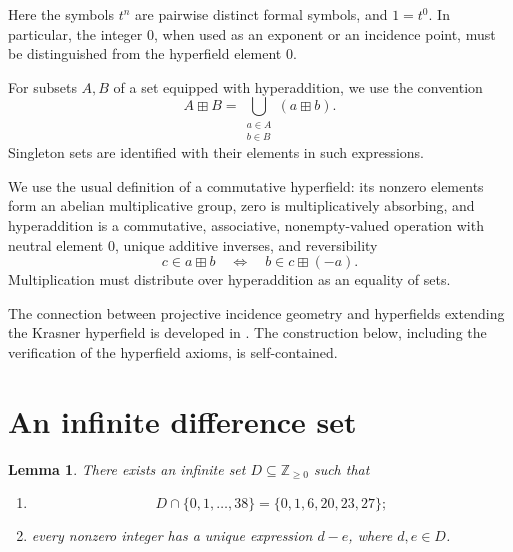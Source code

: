 \documentclass[11pt]{article}
\newcommand{\ZZ}{\mathbb{Z}}
\newtheorem{lemma}[theorem]{Lemma}
\begin{document}
Here the symbols \(t^n\) are pairwise distinct formal symbols, and \(1=t^0\).
In particular, the integer \(0\), when used as an exponent or an incidence
point, must be distinguished from the hyperfield element \(0\).

For subsets \(A,B\) of a set equipped with hyperaddition, we use the convention
\[
    A\boxplus B
    =\bigcup_{\substack{a\in A\\ b\in B}}(a\boxplus b).
\]
Singleton sets are identified with their elements in such expressions.

We use the usual definition of a commutative hyperfield: its nonzero elements
form an abelian multiplicative group, zero is multiplicatively absorbing,
and hyperaddition is a commutative, associative, nonempty-valued operation
with neutral element \(0\), unique additive inverses, and reversibility
\[
    c\in a\boxplus b
    \quad\Longleftrightarrow\quad
    b\in c\boxplus(-a).
\]
Multiplication must distribute over hyperaddition as an equality of sets.


The connection between projective incidence geometry and hyperfields
extending the Krasner hyperfield is developed in
\cite[Sections~3--4]{CC}. The construction below, including the verification
of the hyperfield axioms, is self-contained.

\section{An infinite difference set}

\begin{lemma}\label{lem:difference-set}
There exists an infinite set \(D\subseteq\ZZ_{\geq 0}\) such that
\begin{enumerate}
    \item
    \[
        D\cap\{0,1,\ldots,38\}=\{0,1,6,20,23,27\};
    \]
    \item every nonzero integer has a unique expression \(d-e\), where
    \(d,e\in D\).
\end{enumerate}
\end{lemma}
\end{document}
